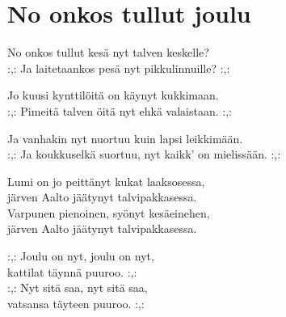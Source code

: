\section{No onkos tullut joulu}
No onkos tullut kesä nyt talven keskelle?\\
:,: Ja laitetaankos pesä nyt pikkulinnuille? :,:

Jo kuusi kynttilöitä on käynyt kukkimaan.\\
:,: Pimeitä talven öitä nyt ehkä valaistaan. :,:

Ja vanhakin nyt nuortuu kuin lapsi leikkimään.\\
:,: Ja koukkuselkä suortuu, nyt kaikk' on mielissään. :,:

Lumi on jo peittänyt kukat laaksosessa,\\
järven Aalto jäätynyt talvipakkasessa.\\
Varpunen pienoinen, syönyt kesäeinehen,\\
järven Aalto jäätynyt talvipakkasessa.

:,: Joulu on nyt, joulu on nyt,\\
kattilat täynnä puuroo. :,:\\
:,: Nyt sitä saa, nyt sitä saa,\\
vatsansa täyteen puuroo. :,: